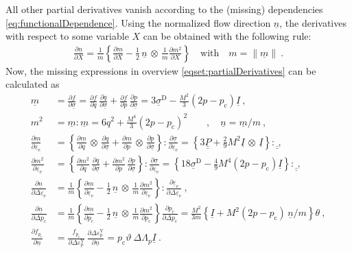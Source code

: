 \documentclass[paper=a4, twoside, pagesize]{scrartcl}
\newcommand{\tensor}[1]{\underline{#1}}
\newcommand{\tensorf}[1]{\underline{\underline{#1}}}
\newcommand{\D}{\text{D}}
\renewcommand{\c}{\text{c}}
\newcommand{\e}{\text{e}}
\newcommand{\p}{\text{p}}
\newcommand{\with}{\text{with}}
\newcommand{\dyad}{\,\otimes\,}
\begin{document}
All other partial derivatives vanish according to the (missing) dependencies \eqref{eq:functionalDependence}. Using the normalized flow direction $\tensor n$, the derivatives with respect to some variable $X$ can be obtained with the following rule:
\begin{align}
  \frac{\partial\tensor n}{\partial X} = \frac{1}{m}\left\{\frac{\partial\tensor m}{\partial X} - \frac{1}{2}\,\tensor n\dyad\frac{1}{m}\frac{\partial m^2}{\partial X} \right\}\quad\with\quad m=\|\tensor m\| \ .
\end{align}
Now, the missing expressions in overview \eqref{eqset:partialDerivatives} can be calculated as
\begin{subequations}
\begin{align}
  \tensor m &= \frac{\partial f}{\partial \tensor\sigma} = \frac{\partial f}{\partial q}\,\frac{\partial q}{\partial \tensor\sigma} +\frac{\partial f}{\partial p}\,\frac{\partial p}{\partial \tensor\sigma} 
  = 3\tensor\sigma^\D - \frac{M^2}{3}(2p-p_\c) \tensor I \ , 
  \\
  m^2 &= \tensor m : \tensor m = 6q^2 + \frac{M^4}{3}(2p-p_\c)^2 \qquad , \quad \tensor n = \tensor m/m \ , 
  \\
  \frac{\partial\tensor m}{\partial\tensor\varepsilon_\e} &= \left\{ \frac{\partial\tensor m}{\partial q}\dyad\frac{\partial q}{\partial \tensor\sigma} + \frac{\partial\tensor m}{\partial p}\dyad\frac{\partial p}{\partial \tensor\sigma} \right\} : \frac{\partial \tensor\sigma}{\partial \tensor\varepsilon_\e}
  = \left\{ 3\tensorf P + \frac{2}{9} M^2 \tensor I\dyad\tensor I \right\} : \tensorf \ , 
  \\
  \frac{\partial m^2}{\partial\tensor\varepsilon_\e} &= \left\{ \frac{\partial m^2}{\partial q}\,\frac{\partial q}{\partial \tensor\sigma} +\frac{\partial m^2}{\partial p}\,\frac{\partial p}{\partial \tensor\sigma} \right\} : \frac{\partial \tensor\sigma}{\partial \tensor\varepsilon_\e} 
  = \left\{ 18\tensor\sigma^\D - \frac{4}{9} M^4 (2p-p_\c)\tensor I \right\} : \tensorf \ , 
  \\
  \frac{\partial\tensor n}{\partial\varDelta\tensor\varepsilon_\e} &= 
  \frac{1}{m}\left\{\frac{\partial\tensor m}{\partial\tensor\varepsilon_\e} - \frac{1}{2}\,\tensor n\dyad\frac{1}{m}\frac{\partial m^2}{\partial\tensor\varepsilon_\e} \right\} :  
  \frac{\partial\tensor\varepsilon_\e}{\partial\varDelta\tensor\varepsilon_\e} \ ,
  \\
  \frac{\partial\tensor n}{\partial\varDelta p_\c} &= 
  \frac{1}{m}\left\{\frac{\partial\tensor m}{\partial p_\c} - \frac{1}{2}\,\tensor n\dyad\frac{1}{m}\frac{\partial m^2}{\partial p_\c} \right\} 
  \frac{\partial p_\c}{\partial\varDelta p_\c} = \frac{M^2}{3m}\left\{\tensor I + M^2(2p-p_\c)\,\tensor n/m \right\} \theta\ , 
  \\
  \frac{\partial f_{p_\c}}{\partial\tensor n} &= \frac{f_{p_\c}}{\partial\varDelta\varepsilon_\p^\text{V}}\, \frac{\partial\varDelta\varepsilon_\p^\text{V}}{\partial\tensor n} 
                                            = p_\c\vartheta\ \varDelta\varLambda_p \tensor I \ .
\end{align}
\end{subequations}
\end{document}
